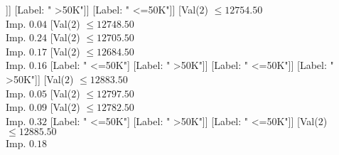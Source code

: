 \documentclass[margin=10pt]{standalone}
\begin{document}
\begin{forest}
																																	[Val($2$) $ \leq 13245.50$ \\ Imp. $0.03$
																																		[Val($2$) $ \leq 13019.50$ \\ Imp. $0.05$
																																			[Val($2$) $ \leq 12977.50$ \\ Imp. $0.06$
																																				[Val($2$) $ \leq 12617.50$ \\ Imp. $0.02$
																																					[Val($2$) $ \leq 12273.50$ \\ Imp. $0.06$
																																						[Val($2$) $ \leq 12269.50$ \\ Imp. $0.18$
																																							[Val($2$) $ \leq 12209.50$ \\ Imp. $0.11$
																																								[Label: " <=50K"]
																																								[Val($2$) $ \leq 12221.50$ \\ Imp. $0.29$
																																									[Label: " >50K"]
																																									[Label: " <=50K"]]]
																																							[Label: " >50K"]]
																																						[Label: " <=50K"]]
																																					[Val($2$) $ \leq 12754.50$ \\ Imp. $0.04$
																																						[Val($2$) $ \leq 12748.50$ \\ Imp. $0.24$
																																							[Val($2$) $ \leq 12705.50$ \\ Imp. $0.17$
																																								[Val($2$) $ \leq 12684.50$ \\ Imp. $0.16$
																																									[Label: " <=50K"]
																																									[Label: " >50K"]]
																																								[Label: " <=50K"]]
																																							[Label: " >50K"]]
																																						[Val($2$) $ \leq 12883.50$ \\ Imp. $0.05$
																																							[Val($2$) $ \leq 12797.50$ \\ Imp. $0.09$
																																								[Val($2$) $ \leq 12782.50$ \\ Imp. $0.32$
																																									[Label: " <=50K"]
																																									[Label: " >50K"]]
																																								[Label: " <=50K"]]
																																							[Val($2$) $ \leq 12885.50$ \\ Imp. $0.18$

\end{forest}
\end{document}
